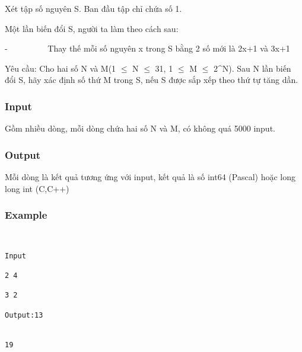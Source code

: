 



   Xét tập số nguyên S. Ban đầu tập chỉ chứa số 1.  

   Một lần biến đổi S, người ta làm theo cách sau:  

   -          Thay thế mỗi số nguyên x trong S bằng 2 số mới là 2x+1 và 3x+1  

   Yêu cầu: Cho hai số N và M(1 $\le$ N $\le$ 31, 1 $\le$ M $\le$ 2^N). Sau N lần biến đổi S, hãy xác định số thứ M trong S, nếu S được sắp xếp theo thứ tự tăng dần.  

\subsubsection{   Input  }

   Gồm nhiều dòng, mỗi dòng chứa hai số N và M, có không quá 5000 input.  

\subsubsection{   Output  }

   Mỗi dòng là kết quả tương ứng với input, kết quả là số int64 (Pascal) hoặc long long int (C,C++)  

\subsubsection{   Example  }
\begin{verbatim}


Input

2 4

3 2

Output:13


19\end{verbatim}
